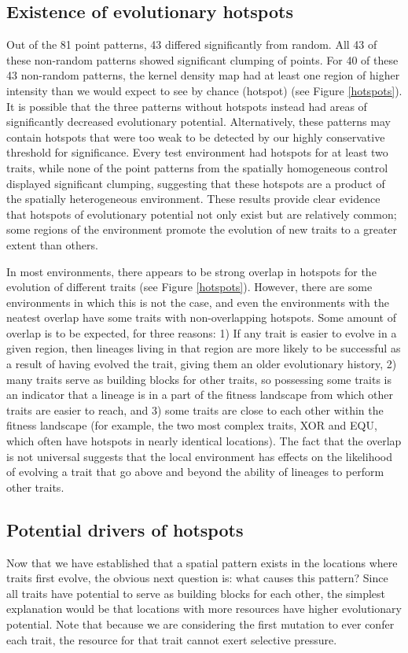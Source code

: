 \subsection{Existence of evolutionary hotspots}
Out of the 81 point patterns, 43 differed significantly from random. All 43 of these non-random patterns showed significant clumping of points. For 40 of these 43 non-random patterns, the kernel density map had at least one region of higher intensity than we would expect to see by chance (hotspot) (see Figure \ref{hotspots}). It is possible that the three patterns without hotspots instead had areas of significantly decreased evolutionary potential. Alternatively, these patterns may contain hotspots that were too weak to be detected by our highly conservative threshold for significance. Every test environment had hotspots for at least two traits, while none of the point patterns from the spatially homogeneous control displayed significant clumping, suggesting that these hotspots are a product of the spatially heterogeneous environment. These results provide clear evidence that hotspots of evolutionary potential not only exist but are relatively common; some regions of the environment promote the evolution of new traits to a greater extent than others.

In most environments, there appears to be strong overlap in hotspots for the evolution of different traits (see Figure \ref{hotspots}). However, there are some environments in which this is not the case, and even the environments with the neatest overlap have some traits with non-overlapping hotspots. Some amount of overlap is to be expected, for three reasons: 1) If any trait is easier to evolve in a given region, then lineages living in that region are more likely to be successful as a result of having evolved the trait, giving them an older evolutionary history, 2) many traits serve as building blocks for other traits, so possessing some traits is an indicator that a lineage is in a part of the fitness landscape from which other traits are easier to reach, and 3) some traits are close to each other within the fitness landscape (for example, the two most complex traits, XOR and EQU, which often have hotspots in nearly identical locations). The fact that the overlap is not universal suggests that the local environment has effects on the likelihood of evolving a trait that go above and beyond the ability of lineages to perform other traits.  

\subsection{Potential drivers of hotspots}
Now that we have established that a spatial pattern exists in the locations where traits first evolve, the obvious next question is: what causes this pattern? Since all traits have potential to serve as building blocks for each other, the simplest explanation would be that locations with more resources have higher evolutionary potential. Note that because we are considering the first mutation to ever confer each trait, the resource for that trait cannot exert selective pressure.

